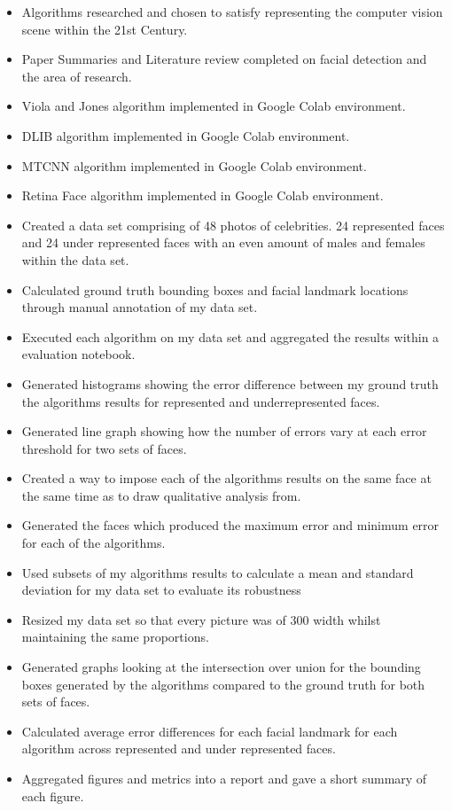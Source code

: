 \documentclass[11pt]{article}
\begin{document}
\begin{itemize}
\item Algorithms researched and chosen to satisfy representing the computer vision scene within the 21st Century.
\item Paper Summaries and Literature review completed on facial detection and the area of research.
\item  Viola and Jones algorithm implemented in Google Colab environment.
\item  DLIB algorithm implemented in Google Colab environment.
\item  MTCNN algorithm implemented in Google Colab environment.
\item  Retina Face algorithm implemented in Google Colab environment.
\item  Created a data set comprising of 48 photos of celebrities. 24 represented faces and 24 under represented faces with an even amount of males and females within the data set.
\item  Calculated ground truth bounding boxes and facial landmark locations through manual annotation of my data set.
\item  Executed each algorithm on my data set and aggregated the results within a evaluation notebook.
\item  Generated histograms showing the error difference between my ground truth the algorithms results for represented and underrepresented faces.
\item  Generated line graph showing how the number of errors vary at each error threshold for two sets of faces.
\item  Created a way to impose each of the algorithms results on the same face at the same time as to draw qualitative analysis from.
\item  Generated the faces which produced the maximum error and minimum error for each of the algorithms.
\item  Used subsets of my algorithms results to calculate a mean and standard deviation for my data set to evaluate its robustness
\item  Resized my data set so that every picture was of 300 width whilst maintaining the same proportions.
\item  Generated graphs looking at the intersection over union for the bounding boxes generated by the algorithms compared to the ground truth for both sets of faces.
\item  Calculated average error differences for each facial landmark for each algorithm across represented and under represented faces.
\item  Aggregated figures and metrics into a report and gave a short summary of each figure. 

\end{itemize}
\end{document}
